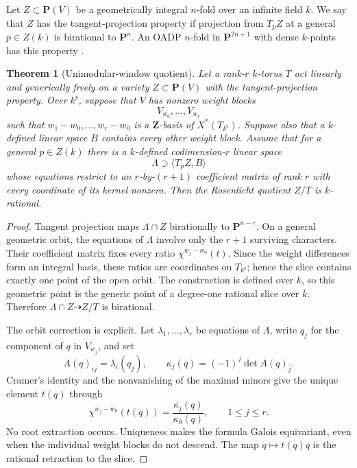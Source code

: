 \documentclass[11pt]{article}
\newtheorem{theorem}{Theorem}[section]
\theoremstyle{remark}
\newcommand{\PP}{\mathbf P}
\newcommand{\Z}{\mathbf Z}
\newcommand{\ks}{k^{\mathrm s}}
\begin{document}
Let \(Z\subset\PP(V)\) be a geometrically integral \(n\)-fold over an infinite
field \(k\).  We say that \(Z\) has the tangent-projection property if
projection from \(T_pZ\) at a general \(p\in Z(k)\) is birational to
\(\PP^n\).  An OADP \(n\)-fold in \(\PP^{2n+1}\) with dense \(k\)-points has
this property \cite[Theorem~2.4]{TZ}.

\begin{theorem}[Unimodular-window quotient]
\label{thm:window}
%
Let a rank-\(r\) \(k\)-torus \(T\) act linearly and generically freely on a
variety \(Z\subset\PP(V)\) with the tangent-projection property.  Over
\(\ks\), suppose that \(V\) has nonzero weight blocks
\[
 V_{w_0},\ldots,V_{w_r}
\]
such that \(w_1-w_0,\ldots,w_r-w_0\) is a \(\Z\)-basis of
\(X^*(T_{\ks})\).  Suppose also that a \(k\)-defined linear space \(B\)
contains every other weight block.  Assume that for a general
\(p\in Z(k)\) there is a \(k\)-defined codimension-\(r\) linear space
\[
 \Lambda\supset\langle T_pZ,B\rangle
\]
whose equations restrict to an \(r\)-by-\((r+1)\) coefficient matrix of rank
\(r\) with every coordinate of its kernel nonzero.  Then the Rosenlicht
quotient \(Z/T\) is \(k\)-rational.
\end{theorem}

\begin{proof}
Tangent projection maps \(\Lambda\cap Z\) birationally to
\(\PP^{n-r}\).  On a general geometric orbit, the equations of \(\Lambda\)
involve only the \(r+1\) surviving characters.  Their coefficient matrix
fixes every ratio
\(\chi^{w_j-w_0}(t)\).  Since the weight differences form an integral basis,
these ratios are coordinates on \(T_{\ks}\); hence the slice contains exactly
one point of the open orbit.  The construction is defined over \(k\), so this
geometric point is the generic point of a degree-one rational slice over
\(k\).  Therefore
\(\Lambda\cap Z\dashrightarrow Z/T\) is birational.

The orbit correction is explicit.  Let
\(\lambda_1,\ldots,\lambda_r\) be equations of \(\Lambda\), write \(q_j\)
for the component of \(q\) in \(V_{w_j}\), and set
\[
 A(q)_{ij}=\lambda_i(q_j),\qquad
 \kappa_j(q)=(-1)^j\det A(q)_{\widehat j}.
\]
Cramer's identity and the nonvanishing of the maximal minors give the unique
element \(t(q)\) through
\[
 \chi^{w_j-w_0}(t(q))=\frac{\kappa_j(q)}{\kappa_0(q)},
 \qquad 1\leq j\leq r.
\]
No root extraction occurs.  Uniqueness makes the formula Galois equivariant,
even when the individual weight blocks do not descend.  The map
\(q\mapsto t(q)q\) is the rational retraction to the slice.
\end{proof}
\end{document}
